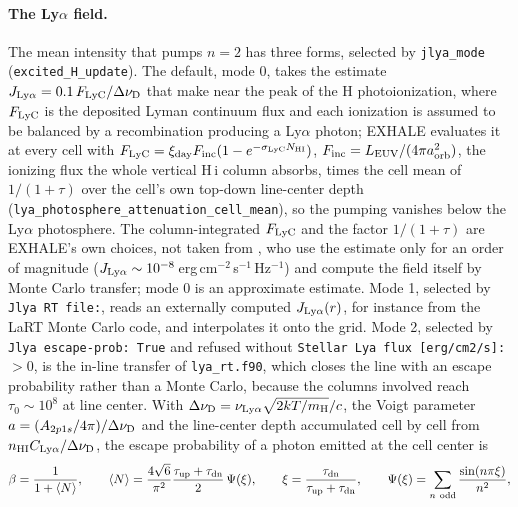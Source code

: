\paragraph{The Ly$\alpha$ field.} The mean intensity that pumps $n=2$ has
three forms, selected by \texttt{jlya\_mode} (\texttt{excited\_H\_update}).
The default, mode 0, takes the estimate
$J_{\rm Ly\alpha} = 0.1\,F_{\rm LyC}/\Delta\nu_{\rm D}$ that
\citet[section~2, in the text after their eq.~6]{Huang2017} make near the
peak of the H photoionization, where $F_{\rm LyC}$ is the deposited Lyman
continuum flux and each ionization is assumed to be balanced by a
recombination producing a Ly$\alpha$ photon; EXHALE evaluates it at every
cell with
$F_{\rm LyC} = \xi_{\rm day}F_{\rm inc}(1-e^{-\sigma_{\rm LyC}N_{\rm HI}})$,
$F_{\rm inc} = L_{\rm EUV}/(4\pi a_{\rm orb}^2)$, the ionizing flux the whole
vertical H\,{\sc i} column absorbs, times the cell mean of
$1/(1+\tau)$ over the cell's own top-down line-center depth
(\texttt{lya\_photosphere\_attenuation\_cell\_mean}), so the pumping vanishes
below the Ly$\alpha$ photosphere. The column-integrated $F_{\rm LyC}$ and the
factor $1/(1+\tau)$ are EXHALE's own choices, not taken from
\citet{Huang2017}, who use the estimate only for an order of magnitude
($J_{\rm Ly\alpha} \sim 10^{-8}$\,erg\,cm$^{-2}$\,s$^{-1}$\,Hz$^{-1}$) and
compute the field itself by Monte Carlo transfer; mode 0 is an approximate
estimate.
Mode 1, selected by \texttt{Jlya RT file:}, reads an externally computed
$J_{\rm Ly\alpha}(r)$, for instance from the LaRT Monte Carlo code, and
interpolates it onto the grid. Mode 2, selected by \texttt{Jlya escape-prob:
True} and refused without \texttt{Stellar Lya flux [erg/cm2/s]:} $>0$, is the
in-line transfer of \texttt{lya\_rt.f90}, which closes the line with an
escape probability rather than a Monte Carlo, because the columns involved
reach $\tau_0 \sim 10^{8}$ at line center. With
$\Delta\nu_{\rm D} = \nu_{\rm Ly\alpha}\sqrt{2kT/m_{\rm H}}/c$, the Voigt
parameter $a = (A_{2p1s}/4\pi)/\Delta\nu_{\rm D}$ and the line-center depth
accumulated cell by cell from $n_{\rm HI}C_{\rm Ly\alpha}/\Delta\nu_{\rm D}$,
the escape probability of a photon emitted at the cell center is
\begin{equation}
\beta = \frac{1}{1+\langle N\rangle},
\qquad
\langle N\rangle = \frac{4\sqrt6}{\pi^{2}}
   \frac{\tau_{\rm up}+\tau_{\rm dn}}{2}\,\Psi(\xi),
\qquad
\xi = \frac{\tau_{\rm dn}}{\tau_{\rm up}+\tau_{\rm dn}},
\qquad
\Psi(\xi) = \sum_{n\ \rm odd}\frac{\sin(n\pi\xi)}{n^{2}},
\label{eq:ion:neufeld}
\end{equation}
